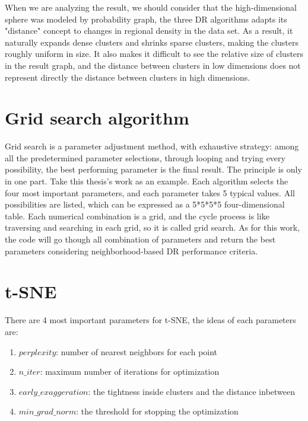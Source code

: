 \noindent When we are analyzing the result, we should consider that the high-dimensional sphere was modeled by probability graph, the three DR algorithms adapts its "distance" concept to changes in regional density in the data set. As a result, it naturally expands dense clusters and shrinks sparse clusters, making the clusters roughly uniform in size. It also makes it difficult to see the relative size of clusters in the result graph, and the distance between clusters in low dimensions does not represent directly the distance between clusters in high dimensions.

\section{Grid search algorithm}

Grid search is a parameter adjustment method, with exhaustive strategy: among all the predetermined parameter selections, through looping and trying every possibility, the best performing parameter is the final result. The principle is only in one part. Take this thesis's work as an example. Each algorithm selects the four most important parameters, and each parameter takes 5 typical values. All possibilities are listed, which can be expressed as a 5*5*5*5 four-dimensional table. Each numerical combination is a grid, and the cycle process is like traversing and searching in each grid, so it is called grid search. As for this work, the code will go though all combination of parameters and return the best parameters considering neighborhood-based DR performance criteria.

\section{t-SNE}
There are 4 most important parameters for t-SNE, the ideas of each parameters are: 

\begin{enumerate}[1)]
\item $perplexity$: number of nearest neighbors for each point
\item $n\_iter$: maximum number of iterations for optimization
\item $early\_exaggeration$: the tightness inside clusters and the distance inbetween
\item $min\_grad\_norm$: the threshold for stopping the optimization 
\end{enumerate}\\



